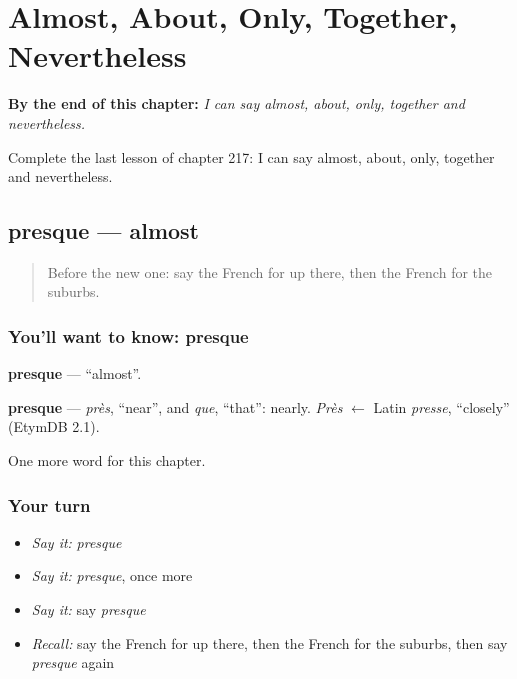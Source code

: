 
\chapter{Almost, About, Only, Together, Nevertheless}
\label{ch:fr-almost-about-only-together-nevertheless}

\begin{chapteropening}
\textbf{By the end of this chapter:} \emph{I can say almost, about, only, together and nevertheless.}

Complete the last lesson of chapter 217: I can say almost, about, only, together and nevertheless.
\end{chapteropening}

\section[presque]{presque — almost}

\label{lesson:FR-C217-presque}



\begin{quote}
Before the new one: say the French for up there, then the French for the suburbs.
\end{quote}

\subsection*{You'll want to know: presque}
\textbf{presque} — \textquotedblleft{}almost\textquotedblright{}.

\begin{cousinweb}
\textbf{presque} — \emph{près}, \textquotedblleft{}near\textquotedblright{}, and \emph{que}, \textquotedblleft{}that\textquotedblright{}: nearly. \emph{Près} $\leftarrow$ Latin \emph{presse}, \textquotedblleft{}closely\textquotedblright{} (EtymDB 2.1).
\end{cousinweb}

\begin{grammarlens}[title={What you've built}]
One more word for this chapter.
\end{grammarlens}

\subsection*{Your turn}
\begin{itemize}
\raggedright
  \item \emph{Say it:} \emph{presque}
  \item \emph{Say it:} \emph{presque}, once more
  \item \emph{Say it:} say \emph{presque}
  \item \emph{Recall:} say the French for up there, then the French for the suburbs, then say \emph{presque} again
\end{itemize}

